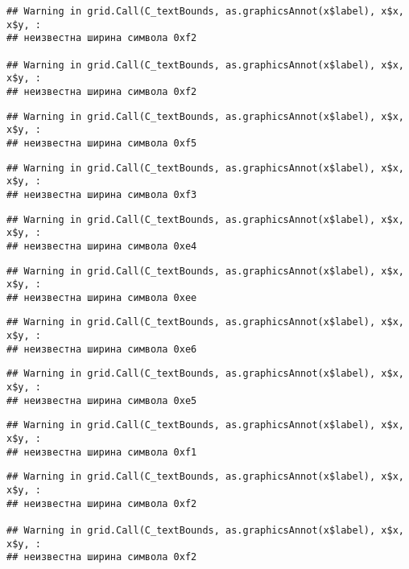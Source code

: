 \documentclass[
]{article}
\begin{document}
\begin{verbatim}
## Warning in grid.Call(C_textBounds, as.graphicsAnnot(x$label), x$x, x$y, :
## неизвестна ширина символа 0xf2

## Warning in grid.Call(C_textBounds, as.graphicsAnnot(x$label), x$x, x$y, :
## неизвестна ширина символа 0xf2
\end{verbatim}

\begin{verbatim}
## Warning in grid.Call(C_textBounds, as.graphicsAnnot(x$label), x$x, x$y, :
## неизвестна ширина символа 0xf5
\end{verbatim}

\begin{verbatim}
## Warning in grid.Call(C_textBounds, as.graphicsAnnot(x$label), x$x, x$y, :
## неизвестна ширина символа 0xf3
\end{verbatim}

\begin{verbatim}
## Warning in grid.Call(C_textBounds, as.graphicsAnnot(x$label), x$x, x$y, :
## неизвестна ширина символа 0xe4
\end{verbatim}

\begin{verbatim}
## Warning in grid.Call(C_textBounds, as.graphicsAnnot(x$label), x$x, x$y, :
## неизвестна ширина символа 0xee
\end{verbatim}

\begin{verbatim}
## Warning in grid.Call(C_textBounds, as.graphicsAnnot(x$label), x$x, x$y, :
## неизвестна ширина символа 0xe6
\end{verbatim}

\begin{verbatim}
## Warning in grid.Call(C_textBounds, as.graphicsAnnot(x$label), x$x, x$y, :
## неизвестна ширина символа 0xe5
\end{verbatim}

\begin{verbatim}
## Warning in grid.Call(C_textBounds, as.graphicsAnnot(x$label), x$x, x$y, :
## неизвестна ширина символа 0xf1
\end{verbatim}

\begin{verbatim}
## Warning in grid.Call(C_textBounds, as.graphicsAnnot(x$label), x$x, x$y, :
## неизвестна ширина символа 0xf2

## Warning in grid.Call(C_textBounds, as.graphicsAnnot(x$label), x$x, x$y, :
## неизвестна ширина символа 0xf2
\end{verbatim}
\end{document}

